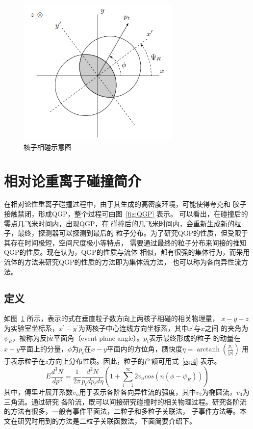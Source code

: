 \documentclass[aps,pre,12pt,preprint,onecolumn,showpacs,showkeys]{revtex4-1}
\begin{document}
\begin{figure}[htbp]
\centering
\includegraphics[width=80mm]{hz}
\caption{\label{fig:hz}%
核子相碰示意图}
\end{figure}
\section{相对论重离子碰撞简介}
在相对论性重离子碰撞过程中，由于其生成的高密度环境，可能使得夸克和
胶子接触禁闭，形成QGP，整个过程可由图~\ref{fig:QGP} 表示\cite{2013PhDT........31Q}。
可以看出，在碰撞后的零点几飞米时间内，出现QGP，在
碰撞后的几飞米时间内，会重新生成新的粒子，最终，探测器可以探测到最后的
粒子分布。为了研究QGP的性质，但受限于其存在时间极短，空间尺度极小等特点，
需要通过最终的粒子分布来间接的推知QGP的性质。现在认为，QGP的性质与流体
相似，都有很强的集体行为，而采用流体的方法来研究QGP的性质的方法即为集体流方法，
也可以称为各向异性流方法\cite{2010LanB...23..240H}。
\subsection{定义}
如图~\ref{fig:hz} 所示，表示的式在垂直粒子数方向上两核子相碰的相关物理量，
$x-y-z$为实验室坐标系，$x^{'}-y^{'}$为两核子中心连线方向坐标系，其中$x^{'}$与$x$之间
的夹角为$\psi_{R}$，被称为反应平面角（event plane angle）。$p_{t}$表示最终形成的粒子
的动量在$x-y$平面上的分量，$\phi$为$p_{t}$在$x-y$平面内的方位角，赝快度$\eta=\operatorname{arctanh}(\frac{p_{z}}{|p|})$
用于表示粒子在$z$方向上分布性质。因此，粒子的产额可用式~\ref{eq:4} 表示\cite{PhysRevC.58.1671}。
\begin{equation}
E\frac{d^{3}N}{dp^{3}}=\frac{1}{2\pi}\frac{d^{2}N}{p_{t}dp_{t}d\eta}(1+\sum_{i=1}^{\infty}2v_{n}cos(n(\phi-\psi_{R}))) \label{eq:4}
\end{equation}
其中，傅里叶展开系数$v_{n}$用于表示各阶各向异性流的强度，其中$v_{2}$为椭圆流，$v_{3}$为三角流。通过研究
各阶流，既可以间接研究碰撞时的相关物理过程。研究各阶流的方法有很多，一般有事件平面法，二粒子和多粒子关联法，
子事件方法等。本文在研究时用到的方法是二粒子关联函数法，下面简要介绍下。
\end{document}
